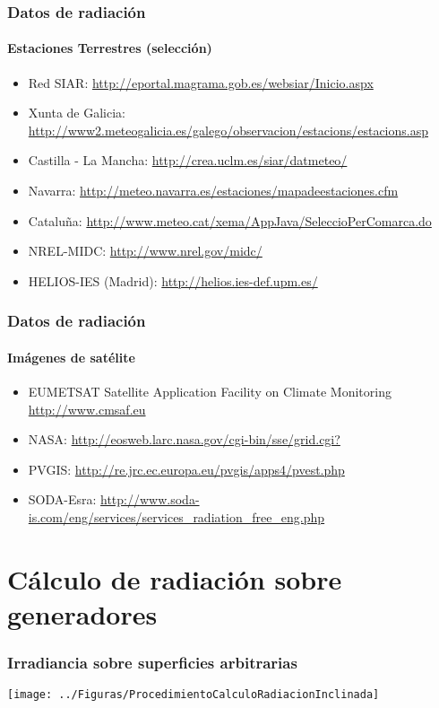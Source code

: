 \documentclass[serif, xcolor=dvipsnames]{beamer}
\begin{document}
\begin{frame}
\frametitle{Datos de radiación}


\framesubtitle{Estaciones Terrestres (selección)}
\begin{itemize}
\item Red SIAR:
  \url{http://eportal.magrama.gob.es/websiar/Inicio.aspx}
\item Xunta de Galicia:
  \url{http://www2.meteogalicia.es/galego/observacion/estacions/estacions.asp}
\item Castilla - La Mancha:
  \url{http://crea.uclm.es/siar/datmeteo/}
\item Navarra:
  \url{http://meteo.navarra.es/estaciones/mapadeestaciones.cfm}
\item Cataluña: \url{http://www.meteo.cat/xema/AppJava/SeleccioPerComarca.do}
\item NREL-MIDC: \url{http://www.nrel.gov/midc/}
\item HELIOS-IES (Madrid): \url{http://helios.ies-def.upm.es/}
\end{itemize}

\end{frame}
\begin{frame}
\frametitle{Datos de radiación}


\framesubtitle{Imágenes de satélite}
\begin{itemize}
\item EUMETSAT Satellite Application Facility on Climate Monitoring
  \url{http://www.cmsaf.eu}
\item NASA: \url{http://eosweb.larc.nasa.gov/cgi-bin/sse/grid.cgi?} 
\item PVGIS: \url{http://re.jrc.ec.europa.eu/pvgis/apps4/pvest.php} 
\item SODA-Esra: \url{http://www.soda-is.com/eng/services/services_radiation_free_eng.php}
\end{itemize}

\end{frame}
\section{Cálculo de radiación sobre generadores}



\begin{frame}[plain]
\frametitle{Irradiancia sobre superficies arbitrarias}

\begin{center}
\texttt{[image: ../Figuras/ProcedimientoCalculoRadiacionInclinada]}
\par\end{center}


\end{frame}
\end{document}
